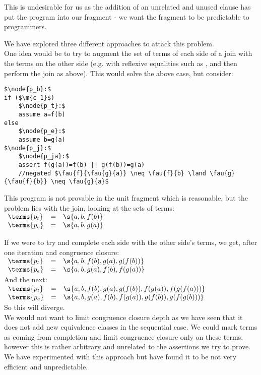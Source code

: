 This is undesirable for us as the addition of an unrelated and unused clause has put the program into our fragment - we want the fragment to be predictable to programmers.

We have explored three different approaches to attack this problem.\\
One idea would be to try to augment the set of terms of each side of a join with the terms on the other side (e.g. with reflexive equalities such as , and then perform the join as above).
This would solve the above case, but consider:

\begin{lstlisting}[caption=join congruence closure co-propagation,label=snippet3.20]
$\node{p_b}:$
if ($\m{c_1}$)
	$\node{p_t}:$
	assume a=f(b)
else
	$\node{p_e}:$
	assume b=g(a)
$\node{p_j}:$
	$\node{p_ja}:$
	assert f(g(a))=f(b) || g(f(b))=g(a) 
	//negated $\fau{f}{\fau{g}{a}} \neq \fau{f}{b} \land \fau{g}{\fau{f}{b}} \neq \fau{g}{a}$
\end{lstlisting}

This program is not provable in the unit fragment which is reasonable, but the problem lies with the join, looking at the sets of terms:\\
$\begin{array}{lll}
	\terms{p_t} & = & \s{a,b,f(b)} \\
	\terms{p_e} & = & \s{a,b,g(a)} \\
\end{array}
$

If we were to try and complete each side with the other side's terms, we get, after one iteration and congruence closure:\\
$\begin{array}{lll}
	\terms{p_t} & = & \s{a,b,f(b),g(a),g(f(b))} \\
	\terms{p_e} & = & \s{a,b,g(a),f(b),f(g(a))} \\
\end{array}
$\\
And the next:\\
$\begin{array}{lll}
	\terms{p_t} & = & \s{a,b,f(b),g(a),g(f(b)),f(g(a)),f(g(f(a)))} \\
	\terms{p_e} & = & \s{a,b,g(a),f(b),f(g(a)),g(f(b)),g(f(g(b)))} \\
\end{array}
$\\
So this will diverge.\\
We would not want to limit congruence closure depth as we have seen that it does not add new equivalence classes in the sequential case.
We could mark terms as coming from completion and limit congruence closure only on these terms, however this is rather arbitrary and unrelated to the assertions we try to prove.
We have experimented with this approach but have found it to be not very efficient and unpredictable.


